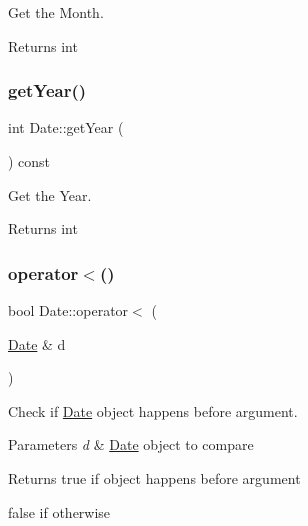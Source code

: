 Get the Month. 

\begin{DoxyReturn}{Returns}
int 
\end{DoxyReturn}
\mbox{\label{classDate_a8b0869f34c2b38d108ab83ee2e770e5d}} 
\subsubsection{\texorpdfstring{get\+Year()}{getYear()}}
{\footnotesize\ttfamily int Date\+::get\+Year (\begin{DoxyParamCaption}{ }\end{DoxyParamCaption}) const}



Get the Year. 

\begin{DoxyReturn}{Returns}
int 
\end{DoxyReturn}
\mbox{\label{classDate_a51d1dadde23783adc9a2ae12d877803c}} 
\subsubsection{\texorpdfstring{operator$<$()}{operator<()}}
{\footnotesize\ttfamily bool Date\+::operator$<$ (\begin{DoxyParamCaption}\item[{\mbox{\hyperlink{classDate}{Date}} \&}]{d }\end{DoxyParamCaption})}



Check if \mbox{\hyperlink{classDate}{Date}} object happens before argument. 


\begin{DoxyParams}{Parameters}
{\em d} & \mbox{\hyperlink{classDate}{Date}} object to compare \\
\hline
\end{DoxyParams}
\begin{DoxyReturn}{Returns}
true if object happens before argument 

false if otherwise 
\end{DoxyReturn}
\mbox{\label{classDate_a49b4e0ed6752c928164fd483720423da}} 
